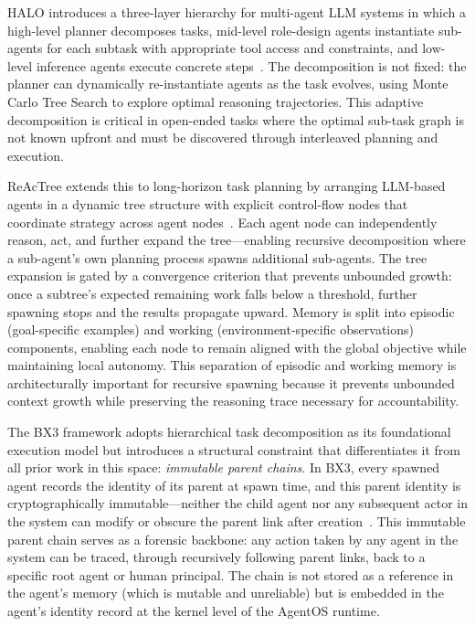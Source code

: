 HALO introduces a three-layer hierarchy for multi-agent LLM systems in which a high-level planner decomposes tasks, mid-level role-design agents instantiate sub-agents for each subtask with appropriate tool access and constraints, and low-level inference agents execute concrete steps~\cite{halo2025}. The decomposition is not fixed: the planner can dynamically re-instantiate agents as the task evolves, using Monte Carlo Tree Search to explore optimal reasoning trajectories. This adaptive decomposition is critical in open-ended tasks where the optimal sub-task graph is not known upfront and must be discovered through interleaved planning and execution.

ReAcTree extends this to long-horizon task planning by arranging LLM-based agents in a dynamic tree structure with explicit control-flow nodes that coordinate strategy across agent nodes~\cite{reactree2025}. Each agent node can independently reason, act, and further expand the tree---enabling recursive decomposition where a sub-agent's own planning process spawns additional sub-agents. The tree expansion is gated by a convergence criterion that prevents unbounded growth: once a subtree's expected remaining work falls below a threshold, further spawning stops and the results propagate upward. Memory is split into episodic (goal-specific examples) and working (environment-specific observations) components, enabling each node to remain aligned with the global objective while maintaining local autonomy. This separation of episodic and working memory is architecturally important for recursive spawning because it prevents unbounded context growth while preserving the reasoning trace necessary for accountability.

The BX3 framework adopts hierarchical task decomposition as its foundational execution model but introduces a structural constraint that differentiates it from all prior work in this space: \emph{immutable parent chains}. In BX3, every spawned agent records the identity of its parent at spawn time, and this parent identity is cryptographically immutable---neither the child agent nor any subsequent actor in the system can modify or obscure the parent link after creation~\cite{bx3-framework}. This immutable parent chain serves as a forensic backbone: any action taken by any agent in the system can be traced, through recursively following parent links, back to a specific root agent or human principal. The chain is not stored as a reference in the agent's memory (which is mutable and unreliable) but is embedded in the agent's identity record at the kernel level of the AgentOS runtime.

